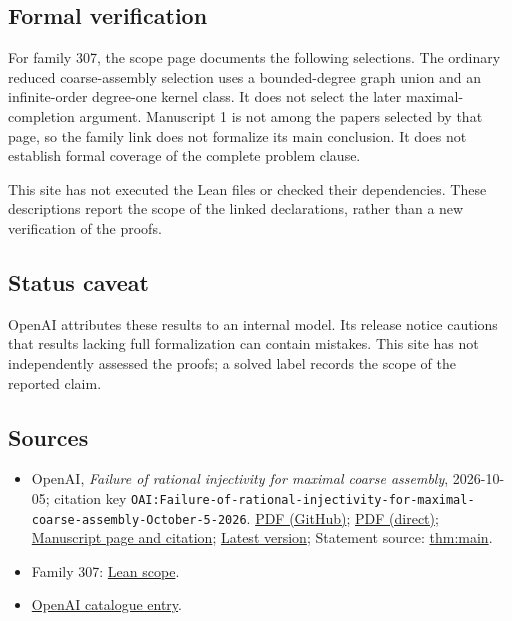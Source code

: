 \documentclass[11pt]{article}
\begin{document}
\subsection{Formal verification}
For family 307, the scope page documents the following selections. The ordinary reduced coarse-assembly selection uses a bounded-degree graph union and an infinite-order degree-one kernel class. It does not select the later maximal-completion argument. Manuscript 1 is not among the papers selected by that page, so the family link does not formalize its main conclusion. It does not establish formal coverage of the complete problem clause.

This site has not executed the Lean files or checked their dependencies. These descriptions report the scope of the linked declarations, rather than a new verification of the proofs.

\subsection{Status caveat}
OpenAI attributes these results to an internal model. Its release notice cautions that results lacking full formalization can contain mistakes. This site has not independently assessed the proofs; a solved label records the scope of the reported claim.

\subsection{Sources}
\begin{itemize}
\item OpenAI, \emph{Failure of rational injectivity for maximal coarse assembly}, 2026-10-05; citation key \texttt{OAI:Failure-of-rational-injectivity-for-maximal-coarse-assembly-October-5-2026}. \href{https://github.com/openai/math/blob/adc7f1241b42e322a6451854ab7e4b4c146bf78a/preprints/Failure-of-rational-injectivity-for-maximal-coarse-assembly-October-5-2026/paper.pdf}{PDF (GitHub)}; \href{https://github.com/openai/math/raw/adc7f1241b42e322a6451854ab7e4b4c146bf78a/preprints/Failure-of-rational-injectivity-for-maximal-coarse-assembly-October-5-2026/paper.pdf}{PDF (direct)}; \href{https://github.com/openai/math/blob/adc7f1241b42e322a6451854ab7e4b4c146bf78a/preprints/Failure-of-rational-injectivity-for-maximal-coarse-assembly-October-5-2026/README.md}{Manuscript page and citation}; \href{https://github.com/openai/math/blob/main/preprints/Failure-of-rational-injectivity-for-maximal-coarse-assembly-October-5-2026/paper.pdf}{Latest version}; Statement source: \href{https://github.com/openai/math/blob/adc7f1241b42e322a6451854ab7e4b4c146bf78a/preprints/Failure-of-rational-injectivity-for-maximal-coarse-assembly-October-5-2026/build/sections/01-introduction.tex\#L36}{thm:main}.
\item Family 307: \href{https://github.com/openai/math/blob/adc7f1241b42e322a6451854ab7e4b4c146bf78a/lean/docs/307.md}{Lean scope}.
\item \href{https://github.com/openai/math/blob/adc7f1241b42e322a6451854ab7e4b4c146bf78a/CONTENTS.md}{OpenAI catalogue entry}.
\end{itemize}
\end{document}
